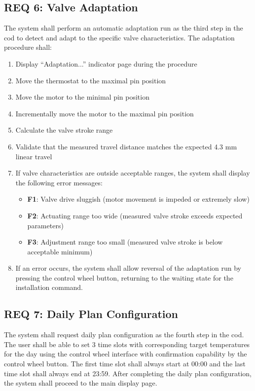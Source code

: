 \subsection*{REQ 6: Valve Adaptation}
\label{subsec:REQ 6: Valve Adaptation}
The system shall perform an automatic adaptation run as the third step in the \acs{cod} to detect and adapt to the specific valve characteristics. The adaptation procedure shall:
\begin{enumerate}
    \item Display ``Adaptation...'' indicator page during the procedure
    \item Move the thermostat to the maximal pin position
    \item Move the motor to the minimal pin position
    \item Incrementally move the motor to the maximal pin position
    \item Calculate the valve stroke range 
    \item Validate that the measured travel distance matches the expected 4.3 mm linear travel
    \item If valve characteristics are outside acceptable ranges, the system shall display the following error messages:
    \begin{itemize}
        \item \textbf{F1}: Valve drive sluggish (motor movement is impeded or extremely slow)
        \item \textbf{F2}: Actuating range too wide (measured valve stroke exceeds expected parameters)
        \item \textbf{F3}: Adjustment range too small (measured valve stroke is below acceptable minimum)
    \end{itemize}
    \item If an error occurs, the system shall allow reversal of the adaptation run by pressing the control wheel button, returning to the waiting state for the installation command.
\end{enumerate}

\subsection*{REQ 7: Daily Plan Configuration}
\label{subsec:REQ 7: Daily Plan Configuration}
The system shall request daily plan configuration as the fourth step in the \acs{cod}. The user shall be able to set 3 time slots with corresponding target temperatures for the day using the control wheel interface with confirmation capability by the control wheel button. The first time slot shall always start at 00:00 and the last time slot shall always end at 23:59. After completing the daily plan configuration, the system shall proceed to the main display page.

